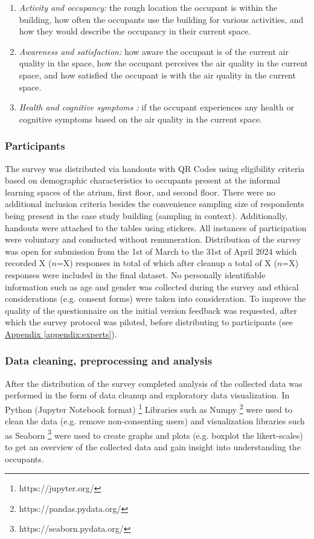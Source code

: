 \begin{enumerate}
  \item \textit{Activity and occupancy:} the rough location the occupant is within the building, how often the occupants use the building for various activities, and how they would describe the occupancy in their current space.
  \item \textit{Awareness and satisfaction:} how aware the occupant is of the current air quality in the space, how the occupant perceives the air quality in the current space, and how satisfied the occupant is with the air quality in the current space.
  \item \textit{Health and cognitive symptoms :} if the occupant experiences any health or cognitive symptoms based on the air quality in the current space.
\end{enumerate}


\subsubsection{Participants}
The survey was distributed via handouts with QR Codes using eligibility criteria based on demographic characteristics to occupants present at the informal learning spaces of the atrium, first floor, and second floor. There were no additional inclusion criteria besides the convenience sampling size of respondents being present in the case study building (sampling in context). Additionally, handouts were attached to the tables using stickers. All instances of participation were voluntary and conducted without remuneration. Distribution of the survey was open for submission from the 1st of March to the 31st of April 2024 which recorded X ($n$=X) responses in total of which after cleanup a total of X ($n$=X) responses were included in the final dataset. No personally identifiable information such as age and gender was collected during the survey and ethical considerations (e.g. consent forms) were taken into consideration. To improve the quality of the questionnaire on the initial version feedback was requested, after which the survey protocol was piloted, before distributing to participants (see \hyperref[appendix:experts]{Appendix \ref*{appendix:experts}}). 

\subsubsection{Data cleaning, preprocessing and analysis}
\label{sec:analysis}
After the distribution of the survey completed analysis of the collected data was performed in the form of data cleanup and exploratory data visualization. In Python (Jupyter Notebook format) \footnote{https://jupyter.org/} Libraries such as Numpy \footnote{https://pandas.pydata.org/} were used to clean the data (e.g. remove non-consenting users) and visualization libraries such as Seaborn \footnote{https://seaborn.pydata.org/} were used to create graphs and plots (e.g. boxplot the likert-scales) to get an overview of the collected data and gain insight into understanding the occupants.

